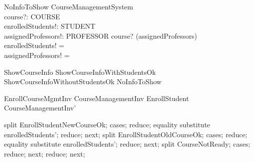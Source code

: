 \begin{schema}{NoInfoToShow}
    \Xi CourseManagementSystem \\
    course?: COURSE \\
    enrolledStudents!: \power STUDENT \\
    assignedProfessors!: \power PROFESSOR
    \where
    course? \notin \dom(assignedProfessors) \\
    enrolledStudents! = \emptyset \\
    assignedProfessors! = \emptyset
\end{schema}

\begin{zed}
    ShowCourseInfo  ShowCourseInfoWithStudentsOk \lor ShowCourseInfoWithoutStudentsOk \lor NoInfoToShow
\end{zed}

\begin{theorem}{EnrollCourseMgmtInv}
CourseManagementInv \land EnrollStudent \implies CourseManagementInv'
\end{theorem}

\begin{zproof}[EnrollCourseMgmtInv]
	split EnrollStudentNewCourseOk;
	cases;
	reduce;
	equality substitute enrolledStudents';
	reduce;
	next;
	split EnrollStudentOldCourseOk;
	cases;
	reduce;
	equality substitute enrolledStudents';
	reduce;
	next;
	split CourseNotReady;
	cases;
	reduce;
	next;
	reduce;
	next;
\end{zproof}


